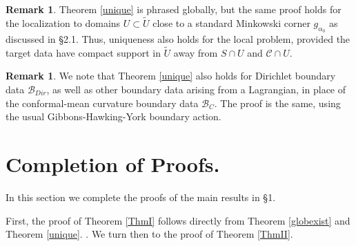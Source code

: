 \documentclass[10pt]{amsart}
\renewcommand{\a}{\alpha}
\newcommand{\cC}{{\mathcal C}}
\newcommand{\cB}{{\mathcal B}}
\newcommand{\<}{\langle}
\renewcommand{\>}{\rangle}
\newcommand{\w}{\widetilde}
\theoremstyle{plain}
\theoremstyle{remark}
\theoremstyle{definition}
\newtheorem{remark}[lemma]{Remark}
\numberwithin{equation}{section}
\begin{document}
\begin{remark}\label{localunique}
{\rm Theorem \ref{unique} is phrased globally, but the same proof holds for the localization to domains $U \subset \w U$ close to a standard Minkowski 
corner $g_{\a_0}$ as discussed in \S 2.1. Thus, uniqueness also holds for the local problem, provided the target data have compact support 
in $\w U$ away from $S\cap U$ and $\cC \cap U$. 
}
\end{remark}

\begin{remark}\label{Dirich}
{\rm We note that Theorem \ref{unique} also holds for Dirichlet boundary data $\cB_{Dir}$, as well as other boundary data arising from a Lagrangian, 
in place of the conformal-mean curvature boundary data $\cB_C$. The proof is the same, using the usual Gibbons-Hawking-York boundary action. 
}
\end{remark}



\section{Completion of Proofs.}

  In this section we complete the proofs of the main results in \S 1. 

\medskip 

 First, the proof of Theorem \ref{ThmI} follows directly from Theorem \ref{globexist} and Theorem \ref{unique}. . 
We turn then to the proof of Theorem \ref{ThmII}. 
\end{document}
